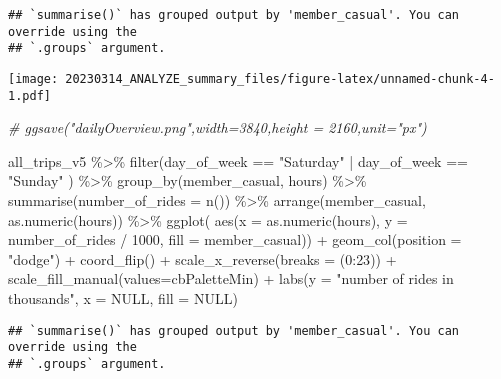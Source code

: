 \documentclass[
]{article}
\newenvironment{Shaded}{\begin{snugshade}}{\end{snugshade}}
\newcommand{\AttributeTok}[1]{\textcolor[rgb]{0.77,0.63,0.00}{#1}}
\newcommand{\CommentTok}[1]{\textcolor[rgb]{0.56,0.35,0.01}{\textit{#1}}}
\newcommand{\ConstantTok}[1]{\textcolor[rgb]{0.00,0.00,0.00}{#1}}
\newcommand{\DecValTok}[1]{\textcolor[rgb]{0.00,0.00,0.81}{#1}}
\newcommand{\FunctionTok}[1]{\textcolor[rgb]{0.00,0.00,0.00}{#1}}
\newcommand{\NormalTok}[1]{#1}
\newcommand{\SpecialCharTok}[1]{\textcolor[rgb]{0.00,0.00,0.00}{#1}}
\newcommand{\StringTok}[1]{\textcolor[rgb]{0.31,0.60,0.02}{#1}}
\begin{document}
\begin{verbatim}
## `summarise()` has grouped output by 'member_casual'. You can override using the
## `.groups` argument.
\end{verbatim}

\texttt{[image: 20230314\_ANALYZE\_summary\_files/figure-latex/unnamed-chunk-4-1.pdf]}

\begin{Shaded}
\begin{Highlighting}[]
\CommentTok{\# ggsave("dailyOverview.png",width=3840,height = 2160,unit="px")}

\NormalTok{all\_trips\_v5 }\SpecialCharTok{\%\textgreater{}\%} 
  \FunctionTok{filter}\NormalTok{(day\_of\_week }\SpecialCharTok{==} \StringTok{"Saturday"} \SpecialCharTok{|}\NormalTok{ day\_of\_week }\SpecialCharTok{==} \StringTok{"Sunday"}\NormalTok{ ) }\SpecialCharTok{\%\textgreater{}\%}
  \FunctionTok{group\_by}\NormalTok{(member\_casual, hours) }\SpecialCharTok{\%\textgreater{}\%} 
  \FunctionTok{summarise}\NormalTok{(}\AttributeTok{number\_of\_rides =} \FunctionTok{n}\NormalTok{()) }\SpecialCharTok{\%\textgreater{}\%} 
  \FunctionTok{arrange}\NormalTok{(member\_casual, }\FunctionTok{as.numeric}\NormalTok{(hours))  }\SpecialCharTok{\%\textgreater{}\%} 
  \FunctionTok{ggplot}\NormalTok{( }\FunctionTok{aes}\NormalTok{(}\AttributeTok{x =} \FunctionTok{as.numeric}\NormalTok{(hours), }\AttributeTok{y =}\NormalTok{ number\_of\_rides }\SpecialCharTok{/} \DecValTok{1000}\NormalTok{, }\AttributeTok{fill =}\NormalTok{ member\_casual)) }\SpecialCharTok{+}
  \FunctionTok{geom\_col}\NormalTok{(}\AttributeTok{position =} \StringTok{"dodge"}\NormalTok{) }\SpecialCharTok{+} 
  \FunctionTok{coord\_flip}\NormalTok{()  }\SpecialCharTok{+}
  \FunctionTok{scale\_x\_reverse}\NormalTok{(}\AttributeTok{breaks =}\NormalTok{ (}\DecValTok{0}\SpecialCharTok{:}\DecValTok{23}\NormalTok{)) }\SpecialCharTok{+}
  \FunctionTok{scale\_fill\_manual}\NormalTok{(}\AttributeTok{values=}\NormalTok{cbPaletteMin) }\SpecialCharTok{+}
  \FunctionTok{labs}\NormalTok{(}\AttributeTok{y =} \StringTok{"number of rides in thousands"}\NormalTok{, }\AttributeTok{x =} \ConstantTok{NULL}\NormalTok{, }\AttributeTok{fill =} \ConstantTok{NULL}\NormalTok{)}
\end{Highlighting}
\end{Shaded}

\begin{verbatim}
## `summarise()` has grouped output by 'member_casual'. You can override using the
## `.groups` argument.
\end{verbatim}
\end{document}
